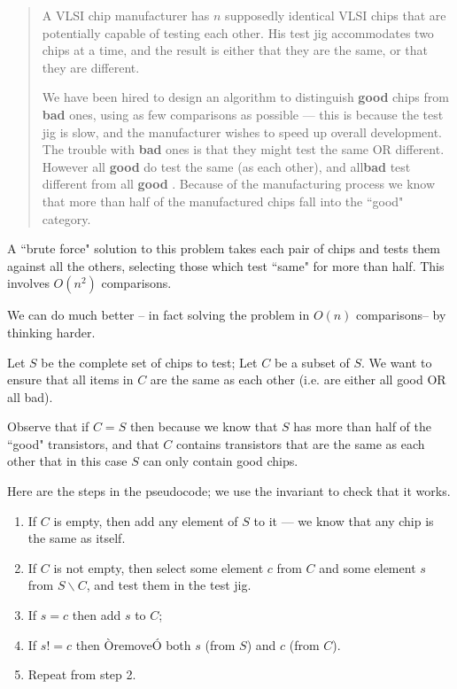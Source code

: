 \documentclass[twoside=false,DIV=14]{scrartcl}
\begin{document}
\begin{quotation}
A VLSI chip manufacturer has $n$ supposedly identical VLSI chips that are potentially capable of testing each other. His test jig accommodates two chips at a time, and the result is either that they are the same, or that they are different. 

We have been hired to design an algorithm to distinguish {\bf good} chips from {\bf bad} ones, using as few comparisons as possible --- this is because the test jig is slow, and the manufacturer wishes to speed up overall development. The trouble with {\bf bad} ones is that they might test the same OR different. However all {\bf good}  do test the same (as each other),  and all{\bf bad} test different from all {\bf good} . Because of the manufacturing process we know that more than half of the manufactured chips fall into the ``good" category. 
\end{quotation}

A ``brute force" solution to this problem takes each pair of chips and tests them against all the others, selecting those which test ``same" for more than half. This involves $O(n^2)$ comparisons. 

We can do much better -- in fact solving the problem in $O(n)$ comparisons-- by thinking harder.

 Let $S$ be the complete set of chips to test; Let $C$ be a subset of $S$. We want to ensure that all items in $C$ are the same as each other (i.e. are either all good OR all bad). 

Observe that  if $C=S$ then because we know that $S$ has more than half of the ``good" transistors, and that $C$ contains transistors that are the same as each other that in this case $S$ can only contain good chips.


Here are the steps in the pseudocode; we use the invariant  to  check that it works.

\begin{enumerate}

\item If $C$ is empty, then add any element of $S$ to it --- we know that any chip is the same as itself. 

\item If $C$ is not empty, then select some element $c$ from $C$
and some element $s$ from $S\backslash C$, and test them in the test jig.

\item If $s=c$ then add $s$ to $C$;

\item If $s !=c$ then ÒremoveÓ both $s$ (from $S$) and $c$ (from $C$).

\item Repeat from step 2.
\end{enumerate}
\end{document}
